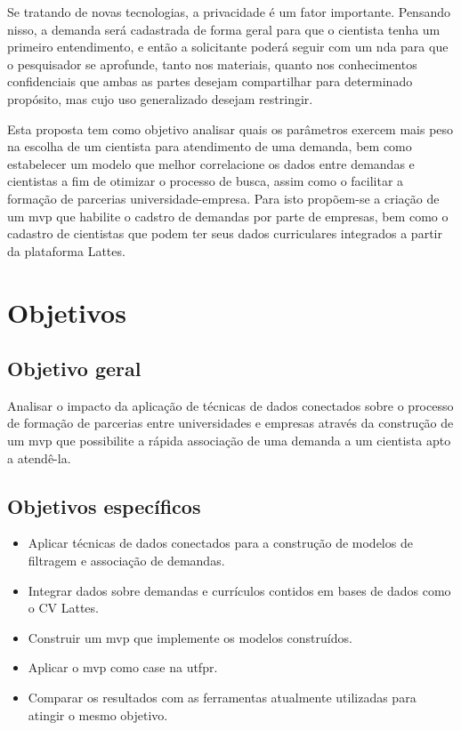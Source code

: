 Se tratando de novas tecnologias, a privacidade é um fator importante. Pensando nisso, a demanda será cadastrada de forma geral para que o cientista tenha um primeiro entendimento, e então a solicitante poderá seguir com um \gls{nda} para que o pesquisador se aprofunde, tanto nos materiais, quanto nos conhecimentos confidenciais que ambas as partes desejam compartilhar para determinado propósito, mas cujo uso generalizado desejam restringir.

Esta proposta tem como objetivo analisar quais os parâmetros exercem mais peso na escolha de um cientista para atendimento de uma demanda, bem como estabelecer um modelo que melhor correlacione os dados entre demandas e cientistas a fim de otimizar o processo de busca, assim como o facilitar a formação de parcerias universidade-empresa. Para isto propõem-se a criação de um \gls{mvp} que habilite o cadstro de demandas por parte de empresas, bem como o cadastro de cientistas que podem ter seus dados curriculares integrados a partir da plataforma Lattes.

\section{Objetivos}\label{sec:objetivos}

\subsection{Objetivo geral}\label{subsec:objetivoGeral}

Analisar o impacto da aplicação de técnicas de dados conectados sobre o processo de formação de parcerias entre universidades e empresas através da construção de um \gls{mvp} que possibilite a rápida associação de uma demanda a um cientista apto a atendê-la.

\subsection{Objetivos específicos}\label{subsec:objetivosEspecificos}

\begin{itemize}
    \item Aplicar técnicas de dados conectados para a construção de modelos de filtragem e associação de demandas.
    \item Integrar dados sobre demandas e currículos contidos em bases de dados como o CV Lattes.
    \item Construir um \gls{mvp} que implemente os modelos construídos.
    \item Aplicar o \gls{mvp} como case na \gls{utfpr}.
    \item Comparar os resultados com as ferramentas atualmente utilizadas para atingir o mesmo objetivo.
\end{itemize}

